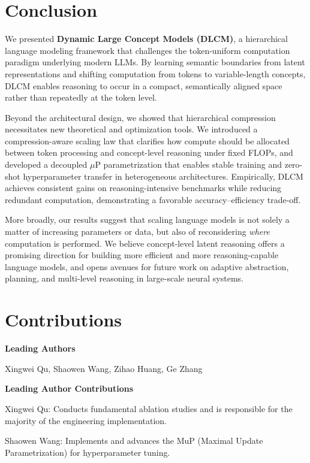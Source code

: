 \section{Conclusion}

We presented \textbf{Dynamic Large Concept Models (DLCM)}, a hierarchical language modeling framework that challenges the token-uniform computation paradigm underlying modern LLMs. By learning semantic boundaries from latent representations and shifting computation from tokens to variable-length concepts, DLCM enables reasoning to occur in a compact, semantically aligned space rather than repeatedly at the token level.

Beyond the architectural design, we showed that hierarchical compression necessitates new theoretical and optimization tools. We introduced a compression-aware scaling law that clarifies how compute should be allocated between token processing and concept-level reasoning under fixed FLOPs, and developed a decoupled $\mu$P parametrization that enables stable training and zero-shot hyperparameter transfer in heterogeneous architectures. Empirically, DLCM achieves consistent gains on reasoning-intensive benchmarks while reducing redundant computation, demonstrating a favorable accuracy--efficiency trade-off.

More broadly, our results suggest that scaling language models is not solely a matter of increasing parameters or data, but also of reconsidering \emph{where} computation is performed. We believe concept-level latent reasoning offers a promising direction for building more efficient and more reasoning-capable language models, and opens avenues for future work on adaptive abstraction, planning, and multi-level reasoning in large-scale neural systems.


\newpage
\section*{Contributions}

\textbf{Leading Authors}

Xingwei Qu, Shaowen Wang, Zihao Huang, Ge Zhang

\textbf{Leading Author Contributions}

Xingwei Qu: Conducts fundamental ablation studies and is responsible for the majority of the engineering implementation.

Shaowen Wang: Implements and advances the MuP (Maximal Update Parametrization) for hyperparameter tuning.

